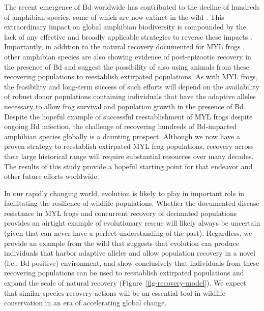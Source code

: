 \documentclass[9pt,twocolumn,twoside,lineno]{pnas-new}
\begin{document}
The recent emergence of Bd worldwide has contributed to the decline of
hundreds of amphibian species, some of which are now extinct in the wild
\citep{scheele2019}. This extraordinary impact on global amphibian
biodiversity is compounded by the lack of any effective and broadly
applicable strategies to reverse these impacts
\citep{garner2016, knapp2022}. Importantly, in addition to the natural
recovery documented for MYL frogs \citep{knapp2016}, other amphibian
species are also showing evidence of post-epizootic recovery in the
presence of Bd \citep{scheele2017, voyles2018} and suggest the
possibility of also using animals from these recovering populations to
reestablish extirpated populations. As with MYL frogs, the feasibility
and long-term success of such efforts will depend on the availability of
robust donor populations containing individuals that have the adaptive
alleles necessary to allow frog survival and population growth in the
presence of Bd. Despite the hopeful example of successful
reestablishment of MYL frogs despite ongoing Bd infection, the challenge
of recovering hundreds of Bd-impacted amphibian species globally is a
daunting prospect. Although we now have a proven strategy to reestablish
extirpated MYL frog populations, recovery across their large historical
range will require substantial resources over many decades. The results
of this study provide a hopeful starting point for that endeavor and
other future efforts worldwide.

In our rapidly changing world, evolution is likely to play in important
role in facilitating the resilience of wildlife populations. Whether the
documented disease resistance in MYL frogs and concurrent recovery of
decimated populations provides an airtight example of evolutionary
rescue will likely always be uncertain (given that can never have a
perfect understanding of the past). Regardless, we provide an example
from the wild that suggests that evolution can produce individuals that
harbor adaptive alleles and allow population recovery in a novel (i.e.,
Bd-positive) environment, and show conclusively that individuals from
these recovering populations can be used to reestablish extirpated
populations and expand the scale of natural recovery
(Figure~\ref{fig-recovery-model}). We expect that similar species
recovery actions will be an essential tool in wildlife conservation in
an era of accelerating global change.
\end{document}

